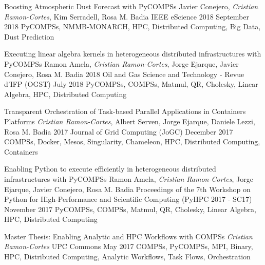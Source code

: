 \begin{publications}
    \publication
        {Boosting Atmospheric Dust Forecast with PyCOMPSs}
        {Javier Conejero, \textit{Cristian Ramon-Cortes}, Kim Serradell, Rosa M. Badia}
        {IEEE eScience 2018}
        {September 2018}
        {PyCOMPSs, NMMB-MONARCH, HPC, Distributed Computing, Big Data, Dust Prediction}
        {}
        
    \publication
        {Executing linear algebra kernels in heterogeneous distributed infrastructures with PyCOMPSs}
        {Ramon Amela, \textit{Cristian Ramon-Cortes}, Jorge Ejarque, Javier Conejero, Rosa M. Badia}
        {2018 Oil and Gas Science and Technology - Revue d’IFP (OGST)}
        {July 2018}
        {PyCOMPSs, COMPSs, Matmul, QR, Cholesky, Linear Algebra, HPC, Distributed Computing}
        {}

    \publication
        {Transparent Orchestration of Task-based Parallel Applications in Containers Platforms}
        {\textit{Cristian Ramon-Cortes}, Albert Serven, Jorge Ejarque, Daniele Lezzi, Rosa M. Badia}
        {2017 Journal of Grid Computing (JoGC)}
        {December 2017}
        {COMPSs, Docker, Mesos, Singularity, Chameleon, HPC, Distributed Computing, Containers}
        {}
        
    \publication
        {Enabling Python to execute efficiently in heterogeneous distributed infrastructures with PyCOMPSs}
        {Ramon Amela, \textit{Cristian Ramon-Cortes}, Jorge Ejarque, Javier Conejero, Rosa M. Badia}
        {Proceedings of the 7th Workshop on Python for High-Performance and Scientific Computing (PyHPC 2017 - SC17)}
        {November 2017}
        {PyCOMPSs, COMPSs, Matmul, QR, Cholesky, Linear Algebra, HPC, Distributed Computing}
        {}
        
    \publication
        {Master Thesis: Enabling Analytic and HPC Workflows with COMPSs}
        {\textit{Cristian Ramon-Cortes}}
        {UPC Commons}
        {May 2017}
        {COMPSs, PyCOMPSs, MPI, Binary, HPC, Distributed Computing, Analytic Workflows, Task Flows, Orchestration}
        {}
\end{publications}

